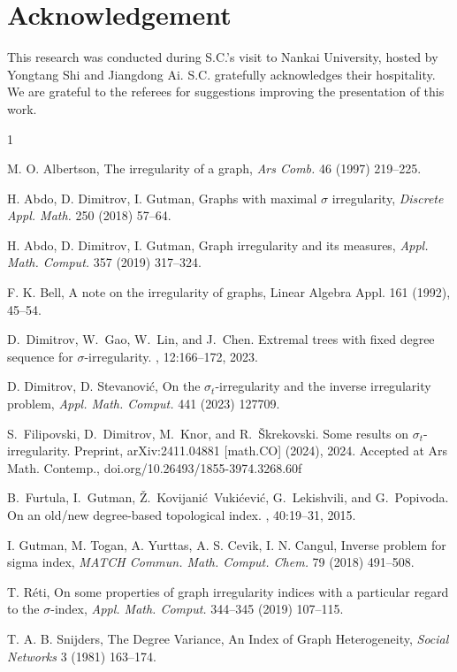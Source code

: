 \documentclass[a4paper,11pt]{article}
\begin{document}
\section*{Acknowledgement}

This research was conducted during S.C.'s visit to Nankai University, hosted by Yongtang Shi and Jiangdong Ai. S.C. gratefully acknowledges their hospitality. We are grateful to the referees for suggestions improving the presentation of this work.







\begin{thebibliography}{1}

 M. O. Albertson, The irregularity of a graph, \emph{Ars Comb.} 46 (1997) 219--225.

 H. Abdo, D. Dimitrov, I. Gutman, Graphs with maximal $\sigma$ irregularity, \emph{Discrete Appl. Math.} 250 (2018) 57--64.

 H. Abdo, D. Dimitrov, I. Gutman, Graph irregularity and its measures, \emph{Appl. Math. Comput.} 357 (2019) 317--324.

F. K. Bell,  A note on the irregularity of graphs, Linear Algebra Appl. 161 (1992), 45--54.
 

D.~Dimitrov, W.~Gao, W.~Lin, and J.~Chen.
\newblock Extremal trees with fixed degree sequence for {{\(\sigma\)}}-irregularity.
, 12:166--172, 2023.

 D. Dimitrov, D. Stevanović, On the $\sigma_{t}$-irregularity and the inverse irregularity problem,
\emph{Appl. Math. Comput.}  441 (2023) 127709.

S.~Filipovski, D.~Dimitrov, M.~Knor, and R.~{\v{S}}krekovski.
\newblock Some results on $\sigma_{t}$-irregularity.
\newblock Preprint, {arXiv}:2411.04881 [math.{CO}] (2024), 2024. Accepted at Ars Math. Contemp., doi.org/10.26493/1855-3974.3268.60f

B.~Furtula, I.~Gutman, {\v{Z}}.~Kovijani{\'c}~Vuki{\'c}evi{\'c}, G.~Lekishvili, and G.~Popivoda.
\newblock On an old/new degree-based topological index.
, 40:19--31, 2015.

 I. Gutman, M. Togan, A. Yurttas, A. S. Cevik, I. N. Cangul, Inverse problem for sigma index, \emph{MATCH Commun. Math. Comput. Chem.} 79 (2018) 491--508.

 T. R\' {e}ti, On some properties of graph irregularity indices with a particular regard to the $\sigma$-index, \emph{Appl. Math. Comput.} 344--345 (2019) 107--115.

 T. A. B. Snijders, The Degree Variance, An Index of Graph Heterogeneity, \emph{Social Networks} 3 (1981) 163--174.

\end{thebibliography}
\end{document}
